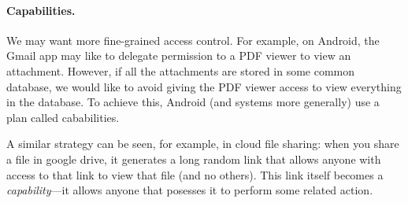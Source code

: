 \paragraph{Capabilities.}
We may want more fine-grained access control. For example, on Android, the Gmail app may like to delegate permission to a PDF viewer to view an attachment. However, if all the attachments are stored in some common database, we would like to avoid giving the PDF viewer access to view everything in the database. To achieve this, Android (and systems more generally) use a plan called cababilities.

A similar strategy can be seen, for example, in cloud file sharing: when you share a file in google drive, it generates a long random link that allows anyone with access to that link to view that file (and no others). This link itself becomes a \emph{capability}---it allows anyone that posesses it to perform some related action.

